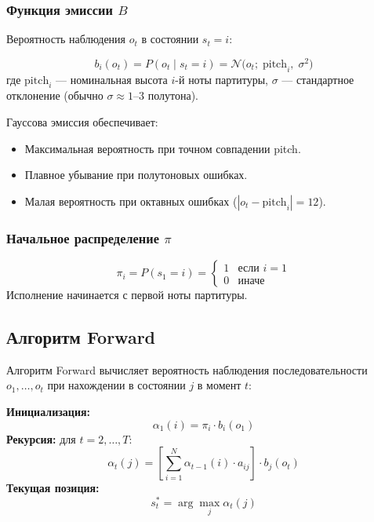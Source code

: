 \documentclass[a4paper,11pt]{article}
\begin{document}
\subsubsection{Функция эмиссии $B$}

Вероятность наблюдения $o_t$ в состоянии $s_t = i$:

\begin{formulabox}[title={Функция эмиссии}]
\[
  b_i(o_t) = P(o_t \mid s_t = i) = \mathcal{N}\bigl(o_t;\; \text{pitch}_i,\; \sigma^2\bigr)
\]
где $\text{pitch}_i$ --- номинальная высота $i$-й ноты партитуры,
$\sigma$ --- стандартное отклонение (обычно $\sigma \approx 1\text{--}3$
полутона).

Гауссова эмиссия обеспечивает:
\begin{itemize}[leftmargin=1.5em]
  \item Максимальная вероятность при точном совпадении pitch.
  \item Плавное убывание при полутоновых ошибках.
  \item Малая вероятность при октавных ошибках ($|o_t - \text{pitch}_i| = 12$).
\end{itemize}
\end{formulabox}

\subsubsection{Начальное распределение $\pi$}

\[
  \pi_i = P(s_1 = i) =
  \begin{cases}
    1 & \text{если } i = 1 \\
    0 & \text{иначе}
  \end{cases}
\]
Исполнение начинается с первой ноты партитуры.

\subsection{Алгоритм Forward}

Алгоритм Forward вычисляет вероятность наблюдения последовательности
$o_1, \ldots, o_t$ при нахождении в состоянии $j$ в момент $t$:

\begin{formulabox}[title={Forward-переменные}]
\textbf{Инициализация:}
\[
  \alpha_1(i) = \pi_i \cdot b_i(o_1)
\]
\textbf{Рекурсия:} для $t = 2, \ldots, T$:
\[
  \alpha_t(j) = \left[\sum_{i=1}^{N} \alpha_{t-1}(i) \cdot a_{ij}\right] \cdot b_j(o_t)
\]
\textbf{Текущая позиция:}
\[
  s_t^* = \arg\max_{j} \alpha_t(j)
\]
\end{formulabox}
\end{document}
